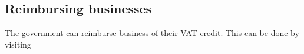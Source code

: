 %		
		
	\subsection{Reimbursing businesses}
	The government can reimburse business of their VAT credit. This can be done 
	by visiting